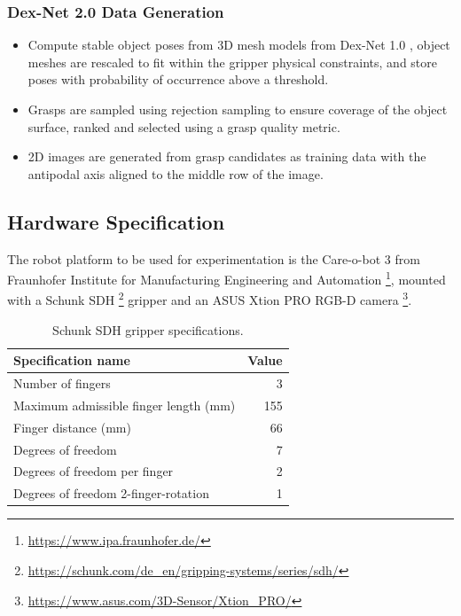 \documentclass[12pt]{article}
\begin{document}
    \subsubsection{Dex-Net 2.0 Data Generation} \label{dexnet-generation}
    \begin{itemize}
        \item Compute stable object poses from 3D mesh models from Dex-Net 1.0 \cite{mahler2016}, object meshes are rescaled to fit within the gripper physical constraints, and store poses with probability of occurrence above a threshold.
        \item Grasps are sampled using rejection sampling to ensure coverage of the object surface, ranked and selected using a grasp quality metric.
        \item 2D images are generated from grasp candidates as training data with the antipodal axis aligned to the middle row of the image.
    \end{itemize}

    \subsection{Hardware Specification} \label{hw-spec}
    The robot platform to be used for experimentation is the Care-o-bot 3 from Fraunhofer Institute for Manufacturing Engineering and Automation \footnote{\url{https://www.ipa.fraunhofer.de/}}, mounted with a Schunk SDH \footnote{\url{https://schunk.com/de_en/gripping-systems/series/sdh/}} gripper and an ASUS Xtion PRO RGB-D camera \footnote{\url{https://www.asus.com/3D-Sensor/Xtion_PRO/}}.

    \begin{table}[H]
        \centering
        \begin{tabular}{lr}
            \toprule
            Specification name & Value \\ \midrule
            Number of fingers & 3 \\
            Maximum admissible finger length (mm) & 155 \\
            Finger distance (mm) & 66 \\
            Degrees of freedom & 7 \\
            Degrees of freedom per finger & 2 \\
            Degrees of freedom 2-finger-rotation & 1\\
            \bottomrule
        \end{tabular}
        \caption{Schunk SDH gripper specifications.}
    \end{table}
\end{document}
